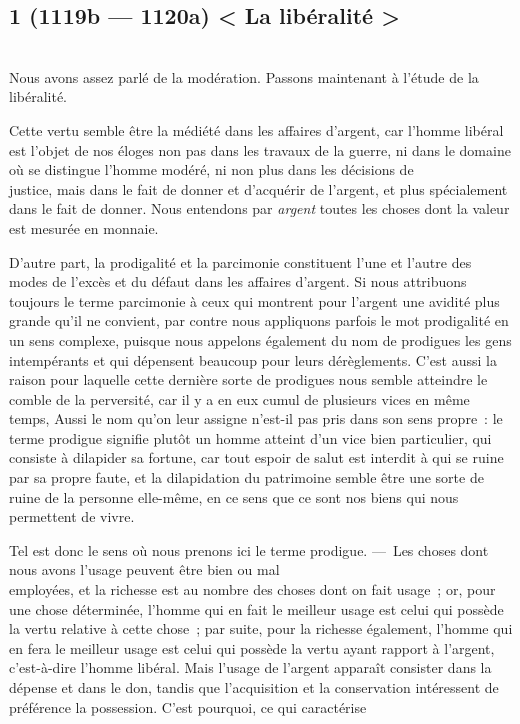 \documentclass[french,twoside]{book} %
\begin{document}
\subsection[{1 (1119b — 1120a) < La libéralité >}]{1 (1119b — 1120a) < La libéralité >}
\noindent \\
Nous avons assez parlé de la modération. Passons maintenant à l’étude de la libéralité.\par
Cette vertu semble être la médiété dans les affaires d’argent, car l’homme libéral est l’objet de nos éloges non pas dans les travaux de la guerre, ni dans le domaine où se distingue l’homme modéré, ni non plus dans les décisions de \\
justice, mais dans le fait de donner et d’acquérir de l’argent, et plus spécialement dans le fait de donner. Nous entendons par {\itshape argent} toutes les choses dont la valeur est mesurée en monnaie.\par
D’autre part, la prodigalité et la parcimonie constituent l’une et l’autre des modes de l’excès et du défaut dans les affaires d’argent. Si nous attribuons toujours le terme parcimonie à ceux qui montrent pour l’argent une avidité plus \\
grande qu’il ne convient, par contre nous appliquons parfois le mot prodigalité en un sens complexe, puisque nous appelons également du nom de prodigues les gens intempérants et qui dépensent beaucoup pour leurs dérèglements. C’est aussi la raison pour laquelle cette dernière sorte de prodigues nous semble atteindre le comble de la perversité, car il y a en eux cumul de plusieurs vices en même temps, Aussi le nom qu’on leur assigne n’est-il pas pris dans son sens propre : le terme prodigue signifie plutôt un homme atteint d’un vice bien  particulier, qui consiste à dilapider sa fortune, car tout espoir de salut est interdit à qui se ruine par sa propre faute, et la dilapidation du patrimoine semble être une sorte de ruine de la personne elle-même, en ce sens que ce sont nos biens qui nous permettent de vivre.\par
Tel est donc le sens où nous prenons ici le terme prodigue. — Les choses dont nous avons l’usage peuvent être bien ou mal \\
employées, et la richesse est au nombre des choses dont on fait usage ; or, pour une chose déterminée, l’homme qui en fait le meilleur usage est celui qui possède la vertu relative à cette chose ; par suite, pour la richesse également, l’homme qui en fera le meilleur usage est celui qui possède la vertu ayant rapport à l’argent, c’est-à-dire l’homme libéral. Mais l’usage de l’argent apparaît consister dans la dépense et dans le don, tandis que l’acquisition et la conservation intéressent de préférence la possession. C’est pourquoi, ce qui caractérise \\
\end{document}
